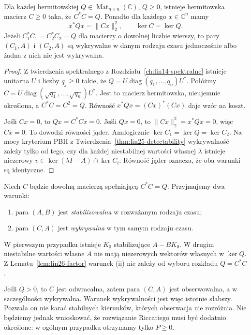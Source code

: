 \begin{lemat}
\label{lem:lin26-factor}
Dla każdej hermitowskiej
\(Q\in\operatorname{Mat}_{n\times n}(\mathbb C)\),
\(Q\ge0\), istnieje
hermitowska macierz \(C\ge0\)
taka, że \(C^*C=Q\).
Ponadto dla każdego
\(x\in\mathbb C^n\) mamy
\[
 x^*Qx=\|Cx\|_2^2,\qquad
 \ker C=\ker Q.
\]
Jeżeli \(C_1^*C_1=C_2^*C_2=Q\)
dla macierzy o dowolnej liczbie
wierszy, to pary
\((C_1,A)\) i \((C_2,A)\)
są wykrywalne w danym rodzaju czasu
jednocześnie albo żadna z nich
nie jest wykrywalna.
\end{lemat}
\begin{proof}
Z twierdzenia spektralnego
z Rozdziału~\ref{ch:lin14-spektralne}
istnieje unitarna \(U\)
i liczby \(q_j\ge0\)
takie, że
\(Q=U\operatorname{diag}(q_1,\ldots,q_n)U^*\).
Połóżmy
\(C=U\operatorname{diag}(\sqrt{q_1},
\ldots,\sqrt{q_n})U^*\).
Jest to macierz hermitowska,
nieujemnie określona, a
\(C^*C=C^2=Q\).
Równość
\(x^*Qx=(Cx)^*(Cx)\)
daje wzór na koszt.

Jeśli \(Cx=0\), to
\(Qx=C^*Cx=0\).
Jeśli \(Qx=0\),
to \(\|Cx\|_2^2=x^*Qx=0\),
więc \(Cx=0\).
To dowodzi równości jąder.
Analogicznie
\(\ker C_1=\ker Q=\ker C_2\).
Na mocy kryterium PBH
z Twierdzenia~\ref{thm:lin25-detectability}
wykrywalność zależy tylko od
tego, czy dla każdej niestabilnej
wartości własnej \(\lambda\)
istnieje niezerowy
\(v\in\ker(\lambda I-A)\cap\ker C_i\).
Równość jąder oznacza,
że oba warunki są identyczne.
\end{proof}

\begin{definicja}
\label{def:lin26-assumptions}
Niech \(C\) będzie dowolną
macierzą spełniającą
\(C^*C=Q\).
Przyjmujemy dwa warunki:
\begin{enumerate}[label=\textup{(\roman*)}]
 \item para \((A,B)\) jest
 \emph{stabilizowalna}
 w rozważanym rodzaju czasu;
 \item para \((C,A)\) jest
 \emph{wykrywalna}
 w tym samym rodzaju czasu.
\end{enumerate}
W pierwszym przypadku
istnieje \(K_0\)
stabilizujące \(A-BK_0\).
W drugim niestabilne
wartości własne \(A\)
nie mają niezerowych
wektorów własnych w \(\ker Q\).
Z
Lematu~\ref{lem:lin26-factor}
warunek (ii) nie zależy
od wyboru rozkładu
\(Q=C^*C\).
\end{definicja}

\begin{uwaga}
\label{rem:lin26-weak-q}
Jeśli \(Q>0\), to \(C\)
jest odwracalna, zatem
para \((C,A)\) jest obserwowalna,
a w szczególności wykrywalna.
Warunek wykrywalności
jest więc istotnie słabszy.
Pozwala on nie karać
stabilnych kierunków, których
obserwacja nie rozróżnia.
Nie będziemy jednak wnioskować,
że rozwiązanie Riccatiego
musi być dodatnio określone:
w ogólnym przypadku otrzymamy
tylko \(P\ge0\).
\end{uwaga}

